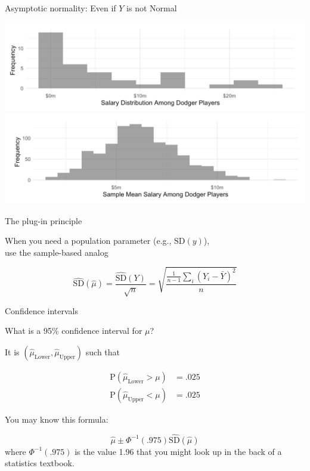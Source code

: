 \documentclass{beamer}
\begin{document}
\begin{frame}{Asymptotic normality: Even if $Y$ is not Normal}

\includegraphics[width = \textwidth]{figures/clt_before} \pause
\includegraphics[width = \textwidth]{figures/clt_after}


\end{frame}

\begin{frame}{The plug-in principle}

When you need a population parameter (e.g., $\text{SD}(y)$),\\use the sample-based analog

$$
\widehat{\text{SD}}(\hat\mu) = \frac{\widehat{\text{SD}}(Y)}{\sqrt{n}} = \sqrt{\frac{\frac{1}{n-1}\sum_i (Y_i - \bar{Y})^2}{n}}
$$

\end{frame}

\begin{frame}{Confidence intervals}

What is a 95\% confidence interval for $\mu$? \pause

It is $(\hat\mu_\text{Lower},\hat\mu_\text{Upper})$ such that

$$
\begin{aligned}
\text{P}(\hat\mu_\text{Lower} > \mu) &= .025 \\
\text{P}(\hat\mu_\text{Upper} < \mu) &= .025
\end{aligned}
$$

You may know this formula:

$$
\hat\mu \pm \Phi^{-1}(.975)\widehat{\text{SD}}(\hat\mu)
$$
where $\Phi^{-1}(.975)$ is the value 1.96 that you might look up in the back of a statistics textbook.
\end{frame}
\end{document}
